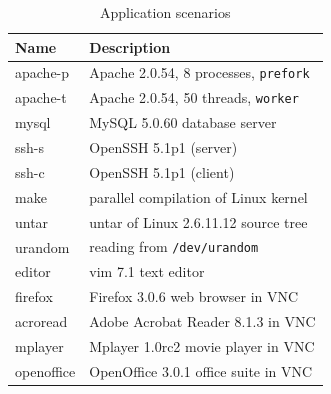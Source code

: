 \begin{table}[]
\begin{table}[t]
\begin{center}
\small
\begin{tabular}{|l|l|}   \hline
\bf{Name}  & \bf{Description}                           \\ \hline
apache-p   & Apache 2.0.54, 8 processes, {\tt prefork}  \\ \hline
apache-t   & Apache 2.0.54, 50 threads, {\tt worker}    \\ \hline
mysql      & MySQL 5.0.60 database server               \\ \hline
ssh-s      & OpenSSH 5.1p1 (server)                     \\ \hline
ssh-c      & OpenSSH 5.1p1 (client)                     \\ \hline
make       & parallel compilation of Linux kernel       \\ \hline
untar      & untar of Linux 2.6.11.12 source tree       \\ \hline
urandom    & reading from {\tt /dev/urandom}            \\ \hline
editor     & vim 7.1 text editor                        \\ \hline
firefox    & Firefox 3.0.6 web browser in VNC           \\ \hline
acroread   & Adobe Acrobat Reader 8.1.3 in VNC          \\ \hline
mplayer    & Mplayer 1.0rc2 movie player in VNC         \\ \hline
openoffice & OpenOffice 3.0.1 office suite in VNC       \\ \hline
\end{tabular}
\caption{Application scenarios}
\label{scribe:tab:scenarios1}
\end{center}
\end{table}


\end{table}
